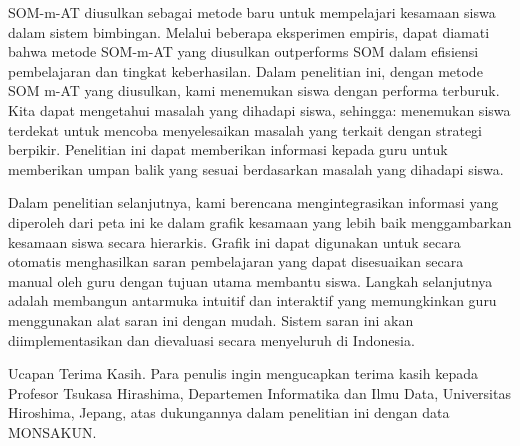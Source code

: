     SOM-m-AT diusulkan sebagai metode baru untuk mempelajari kesamaan siswa dalam sistem bimbingan. Melalui beberapa eksperimen empiris, dapat diamati bahwa metode SOM-m-AT yang diusulkan outperforms SOM dalam efisiensi pembelajaran dan tingkat keberhasilan. Dalam penelitian ini, dengan metode SOM m-AT yang diusulkan, kami menemukan siswa dengan performa terburuk. Kita dapat mengetahui masalah yang dihadapi siswa, sehingga: menemukan siswa terdekat untuk mencoba menyelesaikan masalah yang terkait dengan strategi berpikir. Penelitian ini dapat memberikan informasi kepada guru untuk memberikan umpan balik yang sesuai berdasarkan masalah yang dihadapi siswa.
    
    Dalam penelitian selanjutnya, kami berencana mengintegrasikan informasi yang diperoleh dari peta ini ke dalam grafik kesamaan yang lebih baik menggambarkan kesamaan siswa secara hierarkis. Grafik ini dapat digunakan untuk secara otomatis menghasilkan saran pembelajaran yang dapat disesuaikan secara manual oleh guru dengan tujuan utama membantu siswa. Langkah selanjutnya adalah membangun antarmuka intuitif dan interaktif yang memungkinkan guru menggunakan alat saran ini dengan mudah. Sistem saran ini akan diimplementasikan dan dievaluasi secara menyeluruh di Indonesia.

    Ucapan Terima Kasih. Para penulis ingin mengucapkan terima kasih kepada Profesor Tsukasa Hirashima, Departemen Informatika dan Ilmu Data, Universitas Hiroshima, Jepang, atas dukungannya dalam penelitian ini dengan data MONSAKUN.